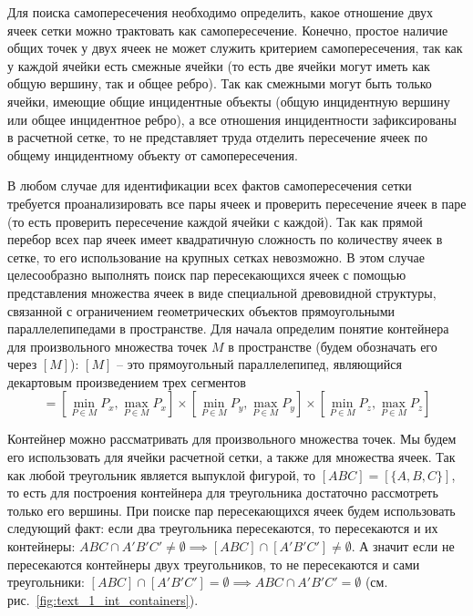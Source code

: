 Для поиска самопересечения необходимо определить, какое отношение двух ячеек сетки можно трактовать как самопересечение.
Конечно, простое наличие общих точек у двух ячеек не может служить критерием самопересечения, так как у каждой ячейки есть смежные ячейки (то есть две ячейки могут иметь как общую вершину, так и общее ребро).
Так как смежными могут быть только ячейки, имеющие общие инцидентные объекты (общую инцидентную вершину или общее инцидентное ребро), а все отношения инцидентности зафиксированы в расчетной сетке, то не представляет труда отделить пересечение ячеек по общему инцидентному объекту от самопересечения.

В любом случае для идентификации всех фактов самопересечения сетки требуется проанализировать все пары ячеек и проверить пересечение ячеек в паре (то есть проверить пересечение каждой ячейки с каждой).
Так как прямой перебор всех пар ячеек имеет квадратичную сложность по количеству ячеек в сетке, то его использование на крупных сетках невозможно.
В этом случае целесообразно выполнять поиск пар пересекающихся ячеек с помощью представления множества ячеек в виде специальной древовидной структуры, связанной с ограничением геометрических объектов прямоугольными параллелепипедами в пространстве.
Для начала определим понятие контейнера для произвольного множества точек $M$ в пространстве (будем обозначать его через $[M]$): $[M]$ -- это прямоугольный параллелепипед, являющийся декартовым произведением трех сегментов
\begin{equation}
[M] = \left[\min_{P \in M}{P_x}, \max_{P \in M}{P_x}\right]
      \times \left[\min_{P \in M}{P_y}, \max_{P \in M}{P_y}\right]
      \times \left[\min_{P \in M}{P_z}, \max_{P \in M}{P_z}\right]
\end{equation}

Контейнер можно рассматривать для произвольного множества точек.
Мы будем его использовать для ячейки расчетной сетки, а также для множества ячеек.
Так как любой треугольник является выпуклой фигурой, то $[ABC] = [\{A, B, C\}]$, то есть для построения контейнера для треугольника достаточно рассмотреть только его вершины.
При поиске пар пересекающихся ячеек будем использовать следующий факт: если два треугольника пересекаются, то пересекаются и их контейнеры: $ABC \cap A'B'C' \ne \emptyset \implies [ABC] \cap [A'B'C'] \ne \emptyset$.
А значит если не пересекаются контейнеры двух треугольников, то не пересекаются и сами треугольники: $[ABC] \cap [A'B'C'] = \emptyset \implies ABC \cap A'B'C' = \emptyset$ (см. рис.~\ref{fig:text_1_int_containers}).

